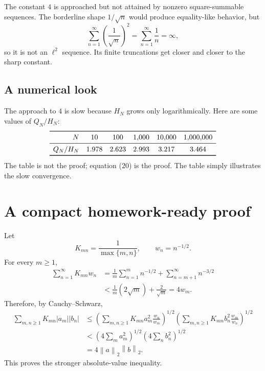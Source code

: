\documentclass[11pt]{article}
\newcommand{\norm}[1]{\left\lVert #1\right\rVert}
\begin{document}
\begin{ideaBox}
The constant \(4\) is approached but not attained by nonzero square-summable sequences. The borderline shape \(1/\sqrt n\) would produce equality-like behavior, but
\[
  \sum_{n=1}^{\infty}\left(\frac1{\sqrt n}\right)^2
  =\sum_{n=1}^{\infty}\frac1n=\infty,
\]
so it is not an \(\ell^2\) sequence. Its finite truncations get closer and closer to the sharp constant.
\end{ideaBox}

\subsection{A numerical look}

The approach to \(4\) is slow because \(H_N\) grows only logarithmically. Here are some values of \(Q_N/H_N\):
\[
\begin{array}{rccccc}
\toprule
N&10&100&1{,}000&10{,}000&1{,}000{,}000\\
\midrule
Q_N/H_N&1.978&2.623&2.993&3.217&3.464\\
\bottomrule
\end{array}
\]
The table is not the proof; equation (20) is the proof. The table simply illustrates the slow convergence.

\section{A compact homework-ready proof}

\begin{solutionBox}
Let
\[
  K_{mn}=\frac1{\max\{m,n\}},
  \qquad w_n=n^{-1/2}.
\]
For every \(m\geq1\),
\[
\begin{aligned}
 \sum_{n=1}^{\infty}K_{mn}w_n
 &=\frac1m\sum_{n=1}^{m}n^{-1/2}
   +\sum_{n=m+1}^{\infty}n^{-3/2}\\
 &<\frac1m(2\sqrt m)+\frac2{\sqrt m}
 =4w_m.
\end{aligned}
\]
Therefore, by Cauchy--Schwarz,
\[
\begin{aligned}
 \sum_{m,n\geq1}K_{mn}|a_m||b_n|
 &\leq
 \left(\sum_{m,n\geq1}K_{mn}a_m^2\frac{w_n}{w_m}\right)^{1/2}
 \left(\sum_{m,n\geq1}K_{mn}b_n^2\frac{w_m}{w_n}\right)^{1/2}\\
 &<\left(4\sum_m a_m^2\right)^{1/2}
    \left(4\sum_n b_n^2\right)^{1/2}\\
 &=4\norm a_2\norm b_2.
\end{aligned}
\]
This proves the stronger absolute-value inequality.
\end{solutionBox}
\end{document}
